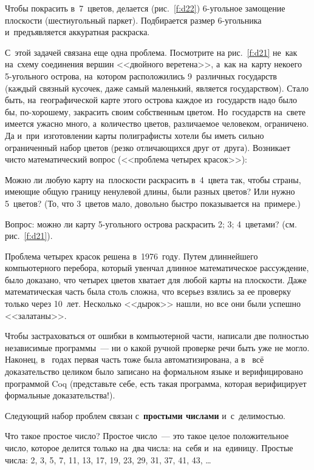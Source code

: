 
\pagebreak

Чтобы покрасить в~7~цветов, делается (рис.~\ref{f:d22}) 6-угольное замощение плоскости (шестиугольный
паркет). Подбирается размер 6-угольника и~предъявляется аккуратная раскраска.

С~этой задачей связана еще одна проблема. Посмотрите на рис.~\ref{f:d21} не~как на~схему соединения вершин
<<двойного веретена>>, а~как на~карту некоего 5-угольного острова, на~котором расположились
9~различных государств (каждый связный кусочек, даже самый маленький, является государством).
 Стало быть, на~географической карте этого острова каждое из~государств надо
было бы, по-хорошему, закрасить своим собственным цветом. Но~государств на~свете имеется ужасно
много, а~количество цветов, различаемое человеком, ограничено. Да и~при~изготовлении карты
полиграфисты хотели бы иметь сильно ограниченный набор цветов (резко отличающихся друг от~друга).
Возникает чисто математический вопрос (<<проблема четырех красок>>):

Можно ли любую карту на~плоскости раскрасить в~4~цвета так, чтобы страны, имеющие общую границу
ненулевой длины, были разных цветов? Или нужно 5~цветов? (То, что 3~цветов мало, довольно быстро
показывается на~примере.)

Вопрос: можно ли карту 5-угольного острова раскрасить 2; 3; 4~цветами? (см. рис.~\ref{f:d21}).

Проблема четырех красок решена в~1976~году. Путем длиннейшего компьютерного
перебора, который увенчал длинное математическое рассуждение, было доказано,
что четырех цветов хватает для любой карты на плоскости. Даже математическая
часть была столь сложна, что всерьез взялись за ее проверку только через 10~лет.
Несколько <<дырок>> нашли, но все они были успешно <<залатаны>>.

Чтобы застраховаться от ошибки в компьютерной части, написали две полностью
независимые программы~--- ни о какой ручной проверке речи быть уже не могло.
Наконец, в~ годах первая часть тоже была автоматизирована, а в~ всё
доказательство целиком было записано на формальном языке\vadjust{\pagebreak} и верифицировано
программой Coq (представьте себе, есть такая программа, которая верифицирует
формальные доказательства!).


Следующий набор проблем связан с~\textbf{простыми числами} и~с~делимостью.

Что такое простое число? Простое число~--- это такое целое положительное число, которое делится
только на~два числа: на~себя и~на~единицу. Простые числа: 2, 3, 5, 7, 11, 13, 17, 19, 23, 29, 31,
37, 41, 43, \ldots

